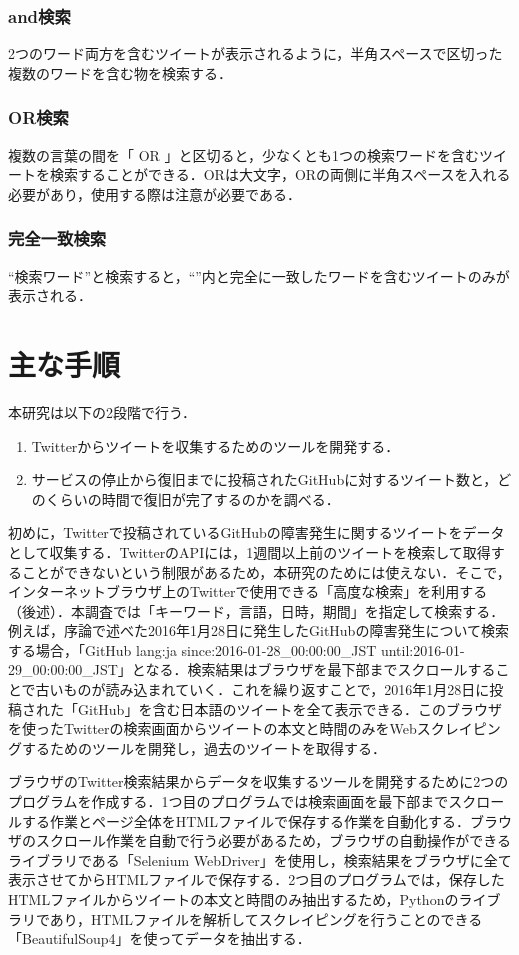 \subsubsection{and検索}
2つのワード両方を含むツイートが表示されるように，半角スペースで区切った複数のワードを含む物を検索する．
\subsubsection{OR検索}
複数の言葉の間を「 OR 」と区切ると，少なくとも1つの検索ワードを含むツイートを検索することができる．ORは大文字，ORの両側に半角スペースを入れる必要があり，使用する際は注意が必要である．
\subsubsection{完全一致検索}
“検索ワード”と検索すると，“”内と完全に一致したワードを含むツイートのみが表示される．
\newpage

\section{主な手順}
本研究は以下の2段階で行う．
\begin{enumerate}
 \item Twitterからツイートを収集するためのツールを開発する．
 \item サービスの停止から復旧までに投稿されたGitHubに対するツイート数と，どのくらいの時間で復旧が完了するのかを調べる．
\end{enumerate}

初めに，Twitterで投稿されているGitHubの障害発生に関するツイートをデータとして収集する．TwitterのAPIには，1週間以上前のツイートを検索して取得することができないという制限があるため，本研究のためには使えない\cite{02}．そこで，インターネットブラウザ上のTwitterで使用できる「高度な検索」を利用する（後述）．本調査では「キーワード，言語，日時，期間」を指定して検索する．例えば，序論で述べた2016年1月28日に発生したGitHubの障害発生について検索する場合，「GitHub lang:ja since:2016-01-28\_00:00:00\_JST until:2016-01-29\_00:00:00\_JST」となる．検索結果はブラウザを最下部までスクロールすることで古いものが読み込まれていく．これを繰り返すことで，2016年1月28日に投稿された「GitHub」を含む日本語のツイートを全て表示できる．このブラウザを使ったTwitterの検索画面からツイートの本文と時間のみをWebスクレイピングするためのツールを開発し，過去のツイートを取得する．

ブラウザのTwitter検索結果からデータを収集するツールを開発するために2つのプログラムを作成する．1つ目のプログラムでは検索画面を最下部までスクロールする作業とページ全体をHTMLファイルで保存する作業を自動化する．ブラウザのスクロール作業を自動で行う必要があるため，ブラウザの自動操作ができるライブラリである「Selenium WebDriver」を使用し，検索結果をブラウザに全て表示させてからHTMLファイルで保存する．2つ目のプログラムでは，保存したHTMLファイルからツイートの本文と時間のみ抽出するため，Pythonのライブラリであり，HTMLファイルを解析してスクレイピングを行うことのできる「BeautifulSoup4」を使ってデータを抽出する．

